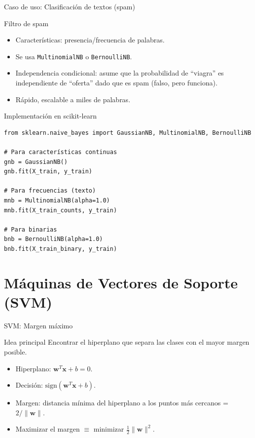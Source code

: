 \documentclass[aspectratio=169, 10pt, xcolor=table]{beamer}
\begin{document}
\begin{frame}{Caso de uso: Clasificación de textos (spam)}
    \begin{exampleblock}{Filtro de spam}
        \begin{itemize}
            \item Características: presencia/frecuencia de palabras.
            \item Se usa \texttt{MultinomialNB} o \texttt{BernoulliNB}.
            \item Independencia condicional: asume que la probabilidad de ``viagra'' es independiente de ``oferta'' dado que es spam (falso, pero funciona).
            \item Rápido, escalable a miles de palabras.
        \end{itemize}
    \end{exampleblock}
\end{frame}

\begin{frame}[fragile]{Implementación en scikit-learn}
    \begin{lstlisting}
from sklearn.naive_bayes import GaussianNB, MultinomialNB, BernoulliNB

# Para características continuas
gnb = GaussianNB()
gnb.fit(X_train, y_train)

# Para frecuencias (texto)
mnb = MultinomialNB(alpha=1.0)
mnb.fit(X_train_counts, y_train)

# Para binarias
bnb = BernoulliNB(alpha=1.0)
bnb.fit(X_train_binary, y_train)
    \end{lstlisting}
\end{frame}

\section{Máquinas de Vectores de Soporte (SVM)}

\begin{frame}{SVM: Margen máximo}
    \begin{block}{Idea principal}
        Encontrar el hiperplano que separa las clases con el mayor margen posible.
    \end{block}
    \begin{itemize}
        \item Hiperplano: $\mathbf{w}^T\mathbf{x} + b = 0$.
        \item Decisión: $\text{sign}(\mathbf{w}^T\mathbf{x} + b)$.
        \item Margen: distancia mínima del hiperplano a los puntos más cercanos = $2/\|\mathbf{w}\|$.
        \item Maximizar el margen $\equiv$ minimizar $\frac{1}{2}\|\mathbf{w}\|^2$.
    \end{itemize}
\end{frame}
\end{document}
